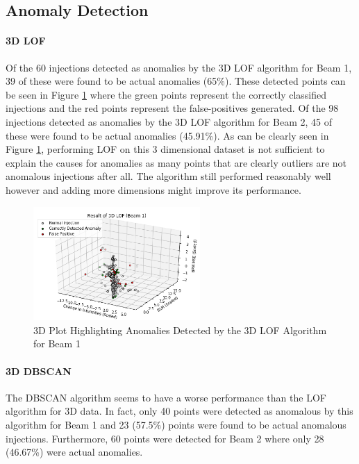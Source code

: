 \documentclass[conference, a4paper]{IEEEtran}
\begin{document}
	\subsection{Anomaly Detection}

	\paragraph{3D LOF}Of the  60 injections detected as anomalies by the 3D LOF algorithm for Beam 1, 39 of these were found to be actual anomalies (65\%). These detected points can be seen in Figure \ref{fig::3D_results1} where the green points represent the correctly classified injections and the red points represent the false-positives generated. Of the 98 injections detected as anomalies by the 3D LOF algorithm for Beam 2, 45 of these were found to be actual anomalies (45.91\%). As can be clearly seen in Figure \ref{fig::3D_results1}, performing LOF on this 3 dimensional dataset is not sufficient to explain the causes for anomalies as many points that are clearly outliers are not anomalous injections after all. The algorithm still performed reasonably well however and adding more dimensions might improve its performance.
	
	\begin{figure}[!t]
		\centering
		\includegraphics[width=2.5in]{3D_LOF_Results}
		\caption[3D LoF Results Beam 1]{3D Plot Highlighting Anomalies Detected by the 3D LOF Algorithm for Beam 1}
		\label{fig::3D_results1}
	\end{figure}

	\paragraph{3D DBSCAN }The DBSCAN algorithm seems to have a worse performance than the LOF algorithm for 3D data. In fact, only 40 points were detected as anomalous by this algorithm for Beam 1 and 23 (57.5\%) points were found to be actual anomalous injections. Furthermore, 60 points were detected for Beam 2 where only 28 (46.67\%) were actual anomalies. 
	
\end{document}
